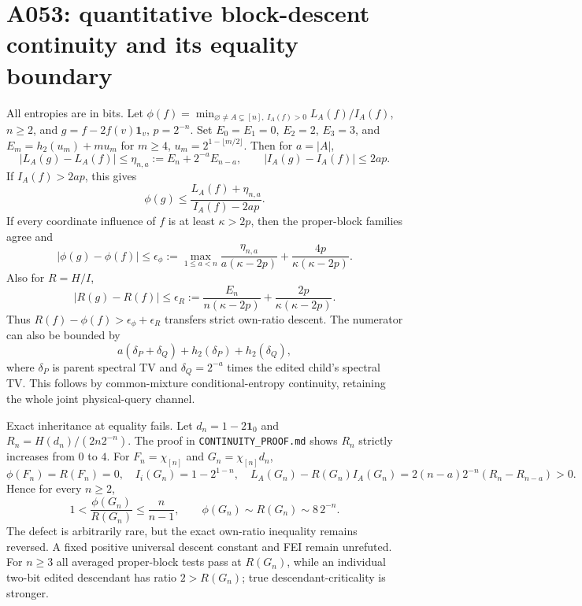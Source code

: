 \documentclass{article}
\begin{document}
\section*{A053: quantitative block-descent continuity and its equality boundary}
All entropies are in bits. Let $\phi(f)=\min_{\varnothing\ne A\subsetneq[n],\ I_A(f)>0}L_A(f)/I_A(f)$, $n\ge2$, and $g=f-2f(v)\mathbf1_v$, $p=2^{-n}$. Set $E_0=E_1=0$, $E_2=2$, $E_3=3$, and $E_m=h_2(u_m)+mu_m$ for $m\ge4$, $u_m=2^{1-\lfloor m/2\rfloor}$. Then for $a=|A|$,
\[
|L_A(g)-L_A(f)|\le\eta_{n,a}:=E_n+2^{-a}E_{n-a},\qquad
|I_A(g)-I_A(f)|\le2ap.
\]
If $I_A(f)>2ap$, this gives
\[
\phi(g)\le\frac{L_A(f)+\eta_{n,a}}{I_A(f)-2ap}.
\]
If every coordinate influence of $f$ is at least $\kappa>2p$, then the proper-block families agree and
\[
|\phi(g)-\phi(f)|\le\epsilon_\phi:=\max_{1\le a<n}\frac{\eta_{n,a}}{a(\kappa-2p)}+\frac{4p}{\kappa(\kappa-2p)}.
\]
Also for $R=H/I$,
\[
|R(g)-R(f)|\le\epsilon_R:=\frac{E_n}{n(\kappa-2p)}+\frac{2p}{\kappa(\kappa-2p)}.
\]
Thus $R(f)-\phi(f)>\epsilon_\phi+\epsilon_R$ transfers strict own-ratio descent. The numerator can also be bounded by
\[
a(\delta_P+\delta_Q)+h_2(\delta_P)+h_2(\delta_Q),
\]
where $\delta_P$ is parent spectral TV and $\delta_Q=2^{-a}$ times the edited child's spectral TV. This follows by common-mixture conditional-entropy continuity, retaining the whole joint physical-query channel.

Exact inheritance at equality fails. Let $d_n=1-2\mathbf1_0$ and $R_n=H(d_n)/(2n2^{-n})$. The proof in \texttt{CONTINUITY\_PROOF.md} shows $R_n$ strictly increases from $0$ to $4$. For $F_n=\chi_{[n]}$ and $G_n=\chi_{[n]}d_n$,
\[
\phi(F_n)=R(F_n)=0,\quad I_i(G_n)=1-2^{1-n},\quad
L_A(G_n)-R(G_n)I_A(G_n)
=2(n-a)2^{-n}(R_n-R_{n-a})>0.
\]
Hence for every $n\ge2$,
\[
1<\frac{\phi(G_n)}{R(G_n)}\le\frac n{n-1},\qquad
\phi(G_n)\sim R(G_n)\sim8\,2^{-n}.
\]
The defect is arbitrarily rare, but the exact own-ratio inequality remains reversed. A fixed positive universal descent constant and FEI remain unrefuted. For $n\ge3$ all averaged proper-block tests pass at $R(G_n)$, while an individual two-bit edited descendant has ratio $2>R(G_n)$; true descendant-criticality is stronger.
\end{document}
